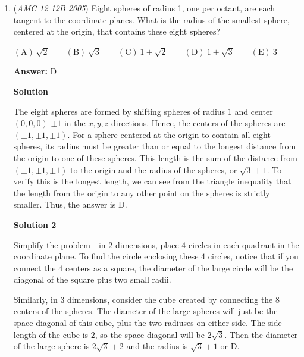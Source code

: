 \begin{enumerate}
 
 \[10(20) + 21 = 221 \quad \text{and} \quad 10(21) + 11 = 221.\]

 Since the sum of the digits $1\text{–}9$ is $45$, removing the largest digit $(9)$  yields a minimum sum of $36$.

 As $21 + 11 = 32 < 36$, the $10(21) + 11$ split is impossible. Therefore, the missing digit is $45 - (20 + 21) = \boxed{d = 4}$.

 


	\item (\textit{AMC 12 12B 2005}) Eight spheres of radius 1, one per octant, are each tangent to the coordinate planes. What is the radius of the smallest sphere, centered at the origin, that contains these eight spheres?


 $\mathrm {(A)}\ \sqrt{2}  \qquad \mathrm {(B)}\ \sqrt{3}  \qquad \mathrm {(C)}\ 1+\sqrt{2}\qquad \mathrm {(D)}\ 1+\sqrt{3}\qquad \mathrm {(E)}\ 3$

 \textbf{Answer: }D



\textbf{Solution}

The eight spheres are formed by shifting spheres of radius $1$ and center $(0, 0, 0)$ $\pm 1$ in the $x, y, z$ directions. Hence, the centers of the spheres are $(\pm 1, \pm 1, \pm 1)$. For a sphere centered at the origin to contain all eight spheres, its radius must be greater than or equal to the longest distance from the origin to one of these spheres. This length is the sum of the distance from $(\pm 1, \pm 1, \pm 1)$ to the origin and the radius of the spheres, or $\sqrt{3} + 1$. To verify this is the longest length, we can see from the triangle inequality that the length from the origin to any other point on the spheres is strictly smaller. Thus, the answer is $\boxed{\mathrm{D}}$.

 



\textbf{Solution 2}

Simplify the problem - in $2$ dimensions, place $4$ circles in each quadrant in the coordinate plane. To find the circle enclosing these $4$ circles, notice that if you connect the $4$ centers as a square, the diameter of the large circle will be the diagonal of the square plus two small radii. 

 Similarly, in $3$ dimensions, consider the cube created by connecting the $8$ centers of the spheres. The diameter of the large spheres will just be the space diagonal of this cube, plus the two radiuses on either side. The side length of the cube is $2$, so the space diagonal will be $2\sqrt{3}$. Then the diameter of the large sphere is $2\sqrt{3} + 2$ and the radius is $\sqrt{3} + 1$ or $\boxed{\mathrm{D}}$.


\end{enumerate}

